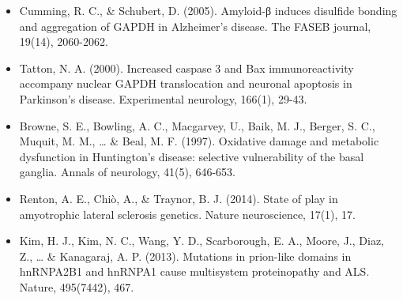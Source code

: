 \documentclass[11pt]{article}
\begin{document}
\begin{itemize}
\begin{itemize}
\item Cumming, R. C., \& Schubert, D. (2005). Amyloid-β induces disulfide bonding and aggregation of GAPDH in Alzheimer’s disease. The FASEB journal, 19(14), 2060-2062.
\item Tatton, N. A. (2000). Increased caspase 3 and Bax immunoreactivity accompany nuclear GAPDH translocation and neuronal apoptosis in Parkinson's disease. Experimental neurology, 166(1), 29-43.
\item Browne, S. E., Bowling, A. C., Macgarvey, U., Baik, M. J., Berger, S. C., Muquit, M. M., \ldots{} \& Beal, M. F. (1997). Oxidative damage and metabolic dysfunction in Huntington's disease: selective vulnerability of the basal ganglia. Annals of neurology, 41(5), 646-653.
\item Renton, A. E., Chiò, A., \& Traynor, B. J. (2014). State of play in amyotrophic lateral sclerosis genetics. Nature neuroscience, 17(1), 17.
\item Kim, H. J., Kim, N. C., Wang, Y. D., Scarborough, E. A., Moore, J., Diaz, Z., \ldots{} \& Kanagaraj, A. P. (2013). Mutations in prion-like domains in hnRNPA2B1 and hnRNPA1 cause multisystem proteinopathy and ALS. Nature, 495(7442), 467.
\end{itemize}

\end{itemize}
\end{document}
